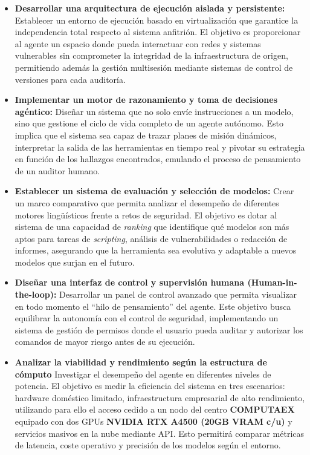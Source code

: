 \begin{itemize}
    \item \textbf{Desarrollar una arquitectura de ejecución aislada y persistente:} Establecer un entorno de ejecución basado en virtualización que garantice la independencia total respecto al sistema anfitrión. El objetivo es proporcionar al agente un espacio donde pueda interactuar con redes y sistemas vulnerables sin comprometer la integridad de la infraestructura de origen, permitiendo además la gestión multisesión mediante sistemas de control de versiones para cada auditoría.
    
    \item \textbf{Implementar un motor de razonamiento y toma de decisiones agéntico:} Diseñar un sistema que no solo envíe instrucciones a un modelo, sino que gestione el ciclo de vida completo de un agente autónomo. Esto implica que el sistema sea capaz de trazar planes de misión dinámicos, interpretar la salida de las herramientas en tiempo real y pivotar su estrategia en función de los hallazgos encontrados, emulando el proceso de pensamiento de un auditor humano.
    
    \item \textbf{Establecer un sistema de evaluación y selección de modelos:} Crear un marco comparativo que permita analizar el desempeño de diferentes motores lingüísticos frente a retos de seguridad. El objetivo es dotar al sistema de una capacidad de \textit{ranking} que identifique qué modelos son más aptos para tareas de \textit{scripting}, análisis de vulnerabilidades o redacción de informes, asegurando que la herramienta sea evolutiva y adaptable a nuevos modelos que surjan en el futuro.
    
    \item \textbf{Diseñar una interfaz de control y supervisión humana (Human-in-the-loop):} Desarrollar un panel de control avanzado que permita visualizar en todo momento el ``hilo de pensamiento'' del agente. Este objetivo busca equilibrar la autonomía con el control de seguridad, implementando un sistema de gestión de permisos donde el usuario pueda auditar y autorizar los comandos de mayor riesgo antes de su ejecución.
    
    \item \textbf{Analizar la viabilidad y rendimiento según la estructura de cómputo} Investigar el desempeño del agente en diferentes niveles de potencia. El objetivo es medir la eficiencia del sistema en tres escenarios: hardware doméstico limitado, infraestructura empresarial de alto rendimiento, utilizando para ello el acceso cedido a un nodo del centro \textbf{COMPUTAEX} equipado con dos GPUs \textbf{NVIDIA RTX A4500 (20GB VRAM c/u)} y servicios masivos en la nube mediante API. Esto permitirá comparar métricas de latencia, coste operativo y precisión de los modelos según el entorno.
    

\end{itemize}

